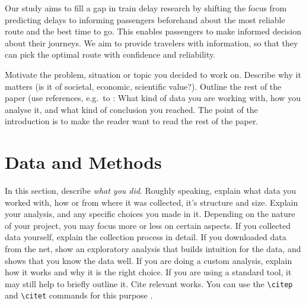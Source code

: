 \documentclass{article}
\theoremstyle{plain}
\theoremstyle{definition}
\theoremstyle{remark}
\begin{document}
Our study aims to fill a gap in train delay research by shifting the focus from predicting delays to informing passengers beforehand about the most reliable route and the best time to go. This enables passengers to make informed decision about their journeys. We aim to provide travelers with information, so that they can pick the optimal route with confidence and reliability.

Motivate the problem, situation or topic you decided to work on. Describe why it matters (is it of societal, economic, scientific value?). Outline the rest of the paper (use references, e.g.~to : What kind of data you are working with, how you analyse it, and what kind of conclusion you reached. The point of the introduction is to make the reader want to read the rest of the paper.

\section{Data and Methods}\label{sec:methods}

In this section, describe \emph{what you did}. Roughly speaking, explain what data you worked with, how or from where it was collected, it's structure and size. Explain your analysis, and any specific choices you made in it. Depending on the nature of your project, you may focus more or less on certain aspects. If you collected data yourself, explain the collection process in detail. If you downloaded data from the net, show an exploratory analysis that builds intuition for the data, and shows that you know the data well. If you are doing a custom analysis, explain how it works and why it is the right choice. If you are using a standard tool, it may still help to briefly outline it. Cite relevant works. You can use the \verb|\citep| and \verb|\citet| commands for this purpose \citep{mackay2003information}.

% 
\end{document}
